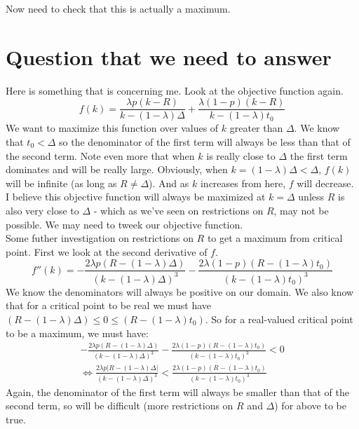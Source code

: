\documentclass{article}
\begin{document}
Now need to check that this is actually a maximum.

\section{Question that we need to answer}

Here is something that is concerning me. Look at the objective function again.
\begin{equation*}
f(k) = \frac{\lambda p (k-R)}{k-(1-\lambda)\Delta} + \frac{\lambda (1-p) (k-R)}{k-(1-\lambda)t_0}
\end{equation*}
We want to maximize this function over values of $k$ greater than $\Delta$. We know that $t_0 < \Delta$ so the denominator of the first term will always be less than that of the second term. Note even more that when $k$ is really close to $\Delta$ the first term dominates and will be really large. Obviously, when $k = (1-\lambda)\Delta < \Delta$, $f(k)$ will be infinite (as long as $R \neq \Delta$). And as $k$ increases from here, $f$ will decrease. I believe this objective function will always be maximized at $k=\Delta$ unless $R$ is also very close to $\Delta$ - which as we've seen on restrictions on $R$, may not be possible. We may need to tweek our objective function. \\

Some futher investigation on restrictions on $R$ to get a maximum from critical point. First we look at the second derivative of $f$.
\begin{equation*}
f''(k) = -\frac{2\lambda p (R-(1-\lambda)\Delta)}{(k-(1-\lambda)\Delta)^3}-\frac{2\lambda(1-p)(R-(1-\lambda)t_0)}{(k-(1-\lambda)t_0)^3}
\end{equation*}
We know the denominators will always be positive on our domain. We also know that for a critical point to be real we must have $(R-(1-\lambda)\Delta) \leq 0 \leq (R-(1-\lambda)t_0)$. So for a real-valued critical point to be a maximum, we must have:
\begin{gather*}
-\frac{2\lambda p (R-(1-\lambda)\Delta)}{(k-(1-\lambda)\Delta)^3}-\frac{2\lambda(1-p)(R-(1-\lambda)t_0)}{(k-(1-\lambda)t_0)^3} < 0 \\
\iff \frac{2\lambda p |R-(1-\lambda)\Delta|}{(k-(1-\lambda)\Delta)^3} < \frac{2\lambda (1-p)(R-(1-\lambda)t_0)}{(k-(1-\lambda)t_0)^3}
\end{gather*}
Again, the denominator of the first term will always be smaller than that of the second term, so will be difficult (more restrictions on $R$ and $\Delta$) for above to be true. \\
\end{document}
